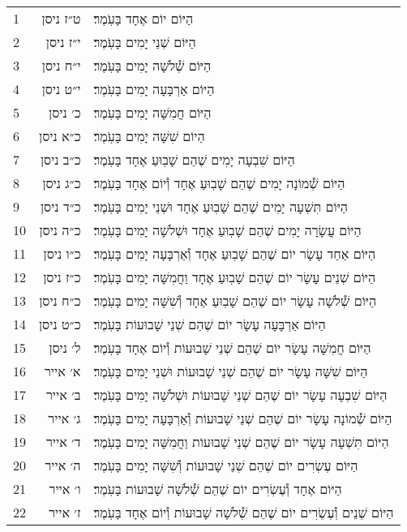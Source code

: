 \documentclass[twoside, openany, parskip=half, 11pt]{book}
\begin{document}
\begin{scriptsize}
\begin{longtable}{ l | r | p{} }
1 & ט״ז ניסן & הַיּוֹם יוֹם אֶחָד בָּעֹֽמֶר׃ \\
2 & י״ז ניסן & הַיּוֹם שְׁנֵי יָמִים בָּעֹֽמֶר׃ \\
3 & י״ח ניסן & הַיּוֹם שְׁ֯לֹשָׁה יָמִים בָּעֹֽמֶר׃ \\
4 & י״ט ניסן & הַיּוֹם אַרְבָּעָה יָמִים בָּעֹֽמֶר׃ \\
5 & כ׳ ניסן & הַיּוֹם חֲמִשָּׁה יָמִים בָּעֹֽמֶר׃ \\
6 & כ״א ניסן & הַיוֹם שִׁשָּׁה יָמִים בָּעֹֽמֶר׃ \\
7 & כ״ב ניסן & הַיּוֹם שִׁבְעָה יָמִים שֶׁהֵם שָׁבֽוּעַ אֶחָד בָּעֹֽמֶר׃ \\
8 & כ״ג ניסן & הַיּוֹם שְׁ֯מוֹנָה יָמִים שֶׁהֵם שָׁבֽוּעַ אֶחָד וְ֯יוֹם אֶחָד בָּעֹֽמֶר׃ \\
9 & כ״ד ניסן & הַיּוֹם תִּשְׁעָה יָמִים שֶׁהֵם שָׁבֽוּעַ אֶחָד וּשְׁנֵי יָמִים בָּעֹֽמֶר׃ \\
10 & כ״ה ניסן & הַיּוֹם עֲשָׂרָה יָמִים שֶׁהֵם שָׁבֽוּעַ אֶחָד וּשְׁלֹשָׁה יָמִים בָּעֹֽמֶר׃ \\
11 & כ״ו ניסן & הַיּוֹם אַחַד עָשָׂר יוֹם שֶׁהֵם שָׁבֽוּעַ אֶחָד וְ֯אַרְבָּעָה יָמִים בָּעֹֽמֶר׃ \\
12 & כ״ז ניסן & הַיּוֹם שְׁנֵים עָשָׂר יוֹם שֶׁהֵם שָׁבֽוּעַ אֶחָד וַחֲמִשָּׁה יָמִים בָּעֹֽמֶר׃ \\
13 & כ״ח ניסן & הַיּוֹם שְׁ֯לֹשָׁה עָשָׂר יוֹם שֶׁהֵם שָׁבֽוּעַ אֶחָד וְ֯שִׁשָּׁה יָמִים בָּעֹֽמֶר׃ \\
14 & כ״ט ניסן & הַיּוֹם אַרְבָּעָה עָשָׂר יוֹם שֶׁהֵם שְׁנֵי שָׁבוּעוֹת בָּעֹֽמֶר׃ \\
15 & ל׳ ניסן & הַיּוֹם חֲמִשָּׁה עָשָׂר יוֹם שֶׁהֵם שְׁנֵי שָׁבוּעוֹת וְ֯יוֹם אֶחָד בָּעֹֽמֶר׃ \\
16 & א׳ אייר & הַיּוֹם שִׁשָּׁה עָשָׂר יוֹם שֶׁהֵם שְׁנֵי שָׁבוּעוֹת וּשְׁנֵי יָמִים בָּעֹֽמֶר׃ \\
17 & ב׳ אייר & הַיּוֹם שִׁבְעָה עָשָׂר יוֹם שֶׁהֵם שְׁנֵי שָׁבוּעוֹת וּשְׁלֹשָׁה יָמִים בָּעֹֽמֶר׃ \\
18 & ג׳ אייר & הַיּוֹם שְׁ֯מוֹנָה עָשָׂר יוֹם שֶׁהֵם שְׁנֵי שָׁבוּעוֹת וְ֯אַרְבָּעָה יָמִים בָּעֹֽמֶר׃ \\
19 & ד׳ אייר & הַיּוֹם תִּשְׁעָה עָשָׂר יוֹם שֶׁהֵם שְׁנֵי שָׁבוּעוֹת וַחֲמִשָּׁה יָמִים בָּעֹֽמֶר׃ \\
20 & ה׳ אייר & הַיּוֹם עֶשְׂרִים יוֹם שֶׁהֵם שְׁנֵי שָׁבוּעוֹת וְ֯שִׁשָּׁה יָמִים בָּעֹֽמֶר׃ \\
21 & ו׳ אייר & הַיּוֹם אֶחָד וְ֯עֶשְׂרִים יוֹם שֶׁהֵם שְׁ֯לֹשָׁה שָׁבוּעוֹת בָּעֹֽמֶר׃ \\
22 & ז׳ אייר & הַיּוֹם שְׁנֵים וְ֯עֶשְׂרִים יוֹם שֶׁהֵם שְׁ֯לֹשָׁה שָׁבוּעוֹת וְ֯יוֹם אֶחָד בָּעֹֽמֶר׃ \\

\end{longtable}
\end{scriptsize}
\end{document}

